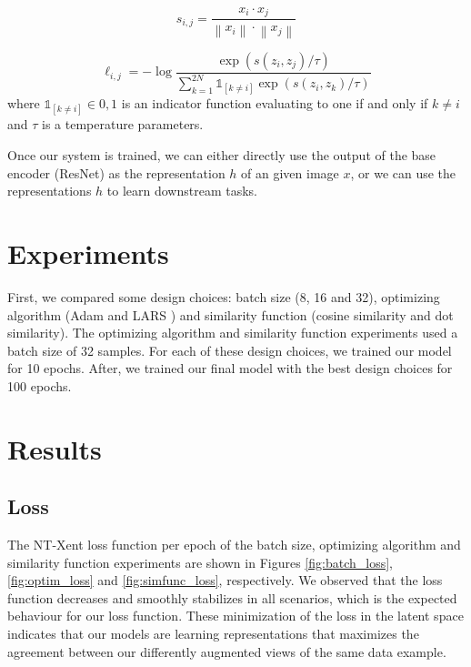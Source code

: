 \documentclass{article}
\newcommand\norm[1]{\left\lVert#1\right\rVert}
\begin{document}
\begin{equation}
  \label{eq:cos_sim}
  s_{i,j} = \dfrac{x_i \cdot x_j}{\norm{x_i} \cdot \norm{x_j}}
\end{equation}

\begin{equation}
  \label{eq:ntxent}
  \ell_{i,j} = -\log \dfrac{\exp (s(z_i, z_j) / \tau )}{\sum_{k=1}^{2N} \mathbb{1}_{[k \neq i]} \exp (s(z_i, z_k) / \tau )}
\end{equation}
where $\mathbb{1}_{[k \neq i]} \in {0,1}$ is an indicator function evaluating to one if and only if $k \neq i$ and $\tau$ is a temperature parameters. 

Once our system is trained, we can either directly use the output of the base encoder (ResNet) as the representation $h$ of an given image $x$, or we can use the representations $h$ to learn downstream tasks.

\section{Experiments}

First, we compared some design choices: batch size (8, 16 and 32), optimizing algorithm (Adam \cite{adam} and LARS \cite{lars}) and similarity function (cosine similarity and dot similarity). The optimizing algorithm and similarity function experiments used a batch size of 32 samples. For each of these design choices, we trained our model for 10 epochs. After, we trained our final model with the best design choices for 100 epochs.

\section{Results}

\subsection{Loss}

The NT-Xent loss function per epoch of the batch size, optimizing algorithm and similarity function experiments are shown in Figures \ref{fig:batch_loss}, \ref{fig:optim_loss} and \ref{fig:simfunc_loss}, respectively.  We observed that the loss function decreases and smoothly stabilizes in all scenarios, which is the expected behaviour for our loss function. These minimization of the loss in the latent space indicates that our models are learning representations that maximizes the agreement between our differently augmented views of the same data example.
\end{document}
